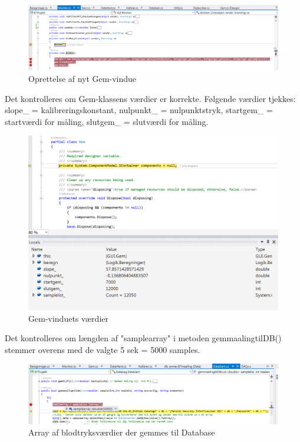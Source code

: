 \begin{figure}[H]
	\centering
	\includegraphics[width=1\textwidth]{Figurer/UC6_BtnGem}
	\caption{Oprettelse af nyt Gem-vindue}
\end{figure}

Det kontrolleres om Gem-klassens værdier er korrekte. Følgende værdier tjekkes: slope\_ = kalibreringskonstant, nulpunkt\_ = nulpunktstryk, startgem\_ = startværdi for måling, slutgem\_ = slutværdi for måling.

\begin{figure}[H]
	\centering
	\includegraphics[width=1\textwidth]{Figurer/UC6_Vardier}
	\caption{Gem-vinduets værdier}
\end{figure}

Det kontrolleres om længden af "samplearray" i metoden gemmaalingtilDB() stemmer overens med de valgte 5 sek = 5000 samples.

\begin{figure}[H]
	\centering
	\includegraphics[width=1\textwidth]{Figurer/UC6_Samplearray}
	\caption{Array af blodtryksværdier der gemmes til Database}
\end{figure}

